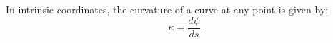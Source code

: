  In intrinsic coordinates, the curvature of a 
curve at any point is given by:
\[ \kappa = \frac{d \psi }{ds} . \]
